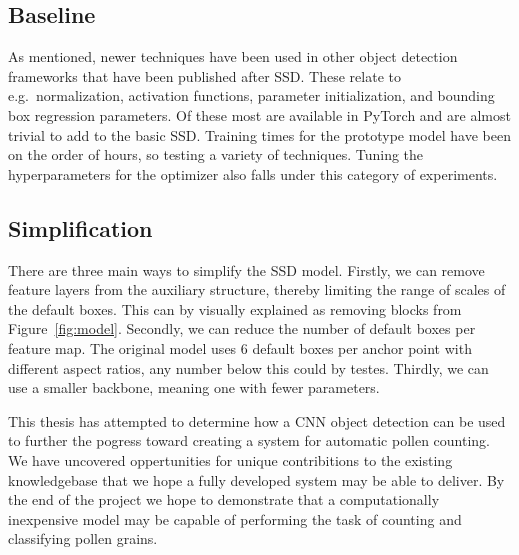 \subsection*{Baseline}
As mentioned, newer techniques have been used in other object detection frameworks that have been published after SSD\@.
These relate to e.g.\ normalization, activation functions, parameter initialization, and bounding box regression parameters.
Of these most are available in PyTorch and are almost trivial to add to the basic SSD\@.
Training times for the prototype model have been on the order of hours, so testing a variety of techniques.
Tuning the hyperparameters for the optimizer also falls under this category of experiments.

\subsection*{Simplification}
There are three main ways to simplify the SSD model.
Firstly, we can remove feature layers from the auxiliary structure, thereby limiting the range of scales of the default boxes.
This can by visually explained as removing blocks from Figure~\ref{fig:model}.
Secondly, we can reduce the number of default boxes per feature map.
The original model uses 6 default boxes per anchor point with different aspect ratios, any number below this could by testes.
Thirdly, we can use a smaller backbone, meaning one with fewer parameters.

This thesis has attempted to determine how a CNN object detection can be used to further the pogress toward creating a system for automatic pollen counting.
We have uncovered oppertunities for unique contribitions to the existing knowledgebase that we hope a fully developed system may be able to deliver.
By the end of the project we hope to demonstrate that a computationally inexpensive model may be capable of performing the task of counting and classifying pollen grains.